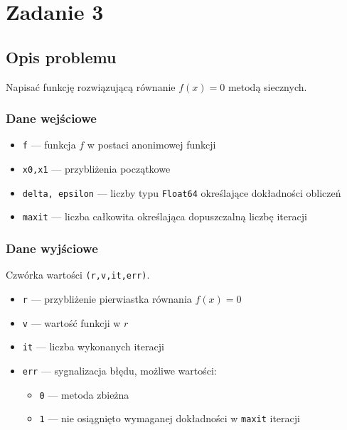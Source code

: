 \documentclass{article}
\begin{document}
\section*{Zadanie 3}
\subsection*{Opis problemu}
	Napisać funkcję rozwiązującą równanie $f(x) = 0$ metodą siecznych.
\subsubsection*{Dane wejściowe}
	\begin{itemize}
	    \item \texttt{f} — funkcja $f$ w postaci anonimowej funkcji
	    \item \texttt{x0,x1} — przybliżenia początkowe
	    \item \texttt{delta, epsilon} — liczby typu \texttt{Float64} określające dokładności obliczeń
	    \item \texttt{maxit} — liczba całkowita określająca dopuszczalną liczbę iteracji
	\end{itemize}
\subsubsection*{Dane wyjściowe}
	Czwórka wartości \texttt{(r,v,it,err)}.
	\begin{itemize}
	    \item \texttt{r} — przybliżenie pierwiastka równania $f(x) = 0$
	    \item \texttt{v} — wartość funkcji w $r$
	    \item \texttt{it} — liczba wykonanych iteracji
	    \item \texttt{err} — sygnalizacja błędu, możliwe wartości:
	    \begin{itemize}
	        \item \texttt{0} — metoda zbieżna
	        \item \texttt{1} — nie osiągnięto wymaganej dokładności w \texttt{maxit} iteracji
	    \end{itemize}
	\end{itemize}
\end{document}
